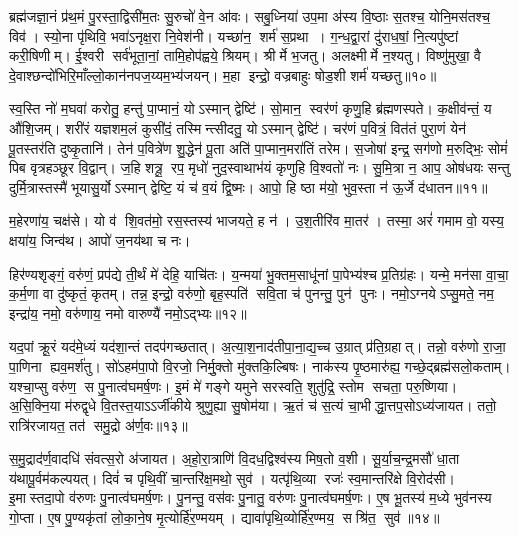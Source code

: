 ब्रह्म॑जज्ञा॒नं प्र॑थ॒मं पु॒रस्ता॒द्विसी॑म॒तः सु॒रुचो॑ वे॒न आ॑वः। 
सबु॒ध्निया॑ उप॒मा अ॑स्य वि॒ष्ठाः स॒तश्च॒ योनि॒मस॑तश्च॒ विव॑। 
स्यो॒ना पृ॑थिवि॒ भवा॑ऽनृक्ष॒रा नि॒वेश॑नी। 
यच्छा॑न॒ शर्म॑ स॒प्रथा। 
ग॒न्ध॒द्वा॒रां दु॑राध॒\ar{}षां॒ नि॒त्यपु॑ष्टां करी॒षिणीम्। 
ई॒श्वरी सर्व॑भूता॒नां॒ तामि॒होप॑ह्वये॒ श्रियम्। 
श्रीर्मे भ॒जतु। 
अलक्ष्मीर्मे न॒श्यतु। 
विष्णु॑मुखा॒ वै दे॒वाश्छन्दो॑भिरि॒माँल्लो॒कान॑नप\-ज॒य्यम॒भ्य॑जयन्। 
म॒हा इन्द्रो॒ वज्रबाहुः षोड॒शी शर्म॑ यच्छतु॥१०॥

 स्व॒स्ति नो॑ म॒घवा॑ करोतु॒ हन्तु॑ पा॒प्मानं॒ योऽस्मान् द्वेष्टि॑। 
 सो॒मान॒ स्वर॑णं कृणु॒हि ब्र॑ह्मणस्पते। 
 क॒क्षीव॑न्तं॒ य औ॑शि॒जम्। 
 शरी॑रं यज्ञशम॒लं कुसी॑दं॒ तस्मिन्त्सीदतु॒ योऽस्मान् द्वेष्टि॑। 
 चर॑णं प॒वित्रं॒ वित॑तं पुरा॒णं येन॑ पू॒तस्तर॑ति दुष्कृ॒तानि॑। 
 तेन॑ प॒वित्रे॑ण शु॒द्धेन॑ पू॒ता अति॑ पा॒प्मान॒मरा॑तिं तरेम। 
 स॒जोषा॑ इन्द्र॒ सग॑णो म॒रुद्भिः॒ सोमं॑ पिब वृत्रहञ्छूर वि॒द्वान्। 
 ज॒हि शत्रू॒ रप॒ मृधो॑ नुद॒स्वाथाभ॑यं कृणुहि वि॒श्वतो॑ नः। 
 सु॒मि॒त्रा न॒ आप॒ ओष॑धयः सन्तु दुर्मि॒त्रास्तस्मै॑ भूयासु॒र्योऽस्मान् द्वेष्टि॒ यं च॑ व॒यं द्वि॒ष्मः। 
 आपो॒ हि ष्ठा म॑यो॒ भुव॒स्ता न॑ ऊ॒र्जे द॑धातन॥११॥
 
 म॒हेरणा॑य॒ चक्ष॑से। 
 यो व॑ शि॒वत॑मो॒ रस॒स्तस्य॑ भाजयते॒ ह न॑। 
 उ॒श॒तीरि॑व मा॒तर॑। 
 तस्मा॒ अरं॑ गमाम वो॒ यस्य॒ क्षया॑य॒ जिन्व॑थ। 
 आपो॑ ज॒नय॑था च नः।

 
हिर॑ण्यशृङ्गं॒ वरु॑णं॒ प्रप॑द्ये ती॒र्थं मे॑ देहि॒ याचि॑तः। 
य॒न्मया॑ भु॒क्तम॒साधू॑नां पा॒पेभ्य॑श्च प्र॒तिग्र॑हः। 
यन्मे॒ मन॑सा वा॒चा॒ क॒र्म॒णा वा दु॑ष्कृतं॒ कृतम्। 
तन्न॒ इन्द्रो॒ वरु॑णो॒ बृह॒स्पति॑ सवि॒ता च॑ पुनन्तु॒ पुन॑ पुनः। 
नमो॒ऽग्नयेऽप्सु॒मते॒ नम॒ इन्द्रा॑य॒ नमो॒ वरु॑णाय॒ नमो वारुण्यै॑ नमो॒ऽद्भ्यः॥१२॥

 यद॒पां क्रू॒रं यद॑मे॒ध्यं यद॑शा॒न्तं तदप॑गच्छतात्। 
 अ॒त्या॒श॒नाद॑ती\-पा॒ना॒द्य॒च्च उ॒ग्रात् प्र॑ति॒ग्रहात्। 
 तन्नो॒ वरु॑णो रा॒जा॒ पा॒णिना ह्यव॒मर्\mbox{}श॑तु। 
 सो॑ऽहम॑पा॒पो वि॒रजो॒ निर्मु॒क्तो मु॑क्तकि॒ल्बिषः। 
 नाक॑स्य पृ॒ष्ठमारु॑ह्य॒ गच्छे॒द्ब्रह्म॑सलो॒कताम्। 
 यश्चा॒प्सु वरु॑ण॒ स पु॒नात्व॑घमर्\mbox{}ष॒णः। 
 इ॒मं मे॑ गङ्गे यमुने सरस्वति॒ शुतु॑द्रि॒ स्तोम सचता॒ परु॒ष्णिया। 
 अ॒सि॒क्नि॒या म॑रुद्\mbox{}वृधे वि॒तस्त॒याऽऽर्जी॑कीये श्रुणु॒ह्या सु॒षोम॑या। 
 ऋ॒तं च॑ स॒त्यं चा॒भीद्धा॒त्तप॒सोऽध्य॑जायत। 
 ततो॒ रात्रि॑रजायत॒ तत॑ समु॒द्रो अ॑र्ण॒वः॥१३॥
 
 स॒मु॒द्राद॑र्ण॒वादधि॑ संवत्स॒रो अ॑जायत। 
 अ॒हो॒रा॒त्राणि॑ वि॒दध॒द्विश्व॑स्य मिष॒तो व॒शी। 
 सू॒र्या॒च॒न्द्र॒मसौ॑ धा॒ता य॑थापू॒र्वम॑कल्पयत्। 
 दिवं॑ च पृथि॒वीं चा॒न्तरि॑क्ष॒मथो॒ सुव॑। 
 यत्पृ॑थि॒व्या रजः॑ स्व॒मान्तरि॑क्षे वि॒रोद॑सी। 
 इ॒मास्तदा॒पो व॑रुणः पु॒नात्व॑घमर्\mbox{}ष॒णः। 
 पु॒नन्तु॒ वस॑वः पु॒नातु॒ वरु॑णः पु॒नात्व॑घमर्\mbox{}ष॒णः। 
 ए॒ष भू॒तस्य॑ म॒ध्ये भुव॑नस्य गो॒प्ता। 
 ए॒ष पु॒ण्यकृ॑तां लो॒का॒ने॒ष मृ॒त्योर्\mbox{}हि॑र॒ण्मयम्। 
 द्यावा॑पृथि॒व्योर्\mbox{}हि॑र॒ण्मय॒ सश्रि॑त॒ सुव॑॥१४॥

